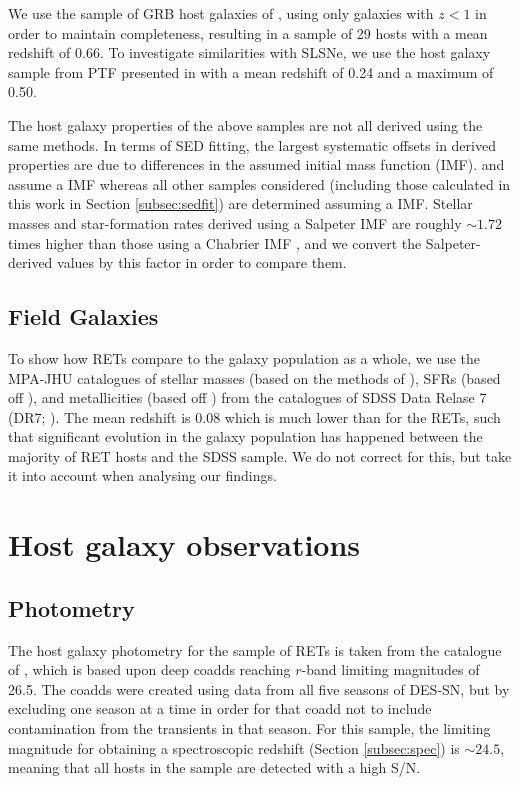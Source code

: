\documentclass[fleqn,usenatbib,]{mnras}
\begin{document}
We use the sample of GRB host galaxies of \citet{Kruehler2015}, using only galaxies with $z<1$ in order to maintain completeness, resulting in a sample of 29 hosts with a mean redshift of 0.66. To investigate similarities with SLSNe, we use the host galaxy sample from PTF presented in \citet{Perley2016c} with a mean redshift of 0.24 and a maximum of 0.50.

The host galaxy properties of the above samples are not all derived using the same methods. In terms of SED fitting, the largest systematic offsets in derived properties are due to differences in the assumed initial mass function (IMF). \citet{Stoll2013} and \citet{Drout2014} assume a \citet{Salpeter1955} IMF whereas all other samples considered (including those calculated in this work in Section \ref{subsec:sedfit}) are determined assuming a \citet{Chabrier2003} IMF. Stellar masses and star-formation rates derived using a Salpeter IMF are roughly $\sim 1.72$ times higher than those using a Chabrier IMF \citep{Speagle2014}, and we convert the Salpeter-derived values by this factor in order to compare them.

\subsection{Field Galaxies \label{subsubsec:sdss}}

To show how RETs compare to the galaxy population as a whole, we use the MPA-JHU catalogues of stellar masses (based on the methods of \citealt{Kauffmann2003,Salim2007}), SFRs (based off \citealt{Brinchmann2004}), and metallicities (based off \citealt{Tremonti2004}) from the  catalogues of SDSS Data Relase 7 (DR7; \citealt{Abazajian2009}). The mean redshift is 0.08 which is much lower than for the RETs, such that significant evolution in the galaxy population has happened between the majority of RET hosts and the SDSS sample. We do not correct for this, but take it into account when analysing our findings. 
\section{Host galaxy observations}
\label{sec:obs}
\subsection{Photometry \label{subsec:phot}}

The host galaxy photometry for the sample of RETs is taken from the catalogue of , which is based upon deep coadds reaching $r$-band limiting magnitudes of 26.5. The coadds were created using data from all five seasons of DES-SN, but by excluding one season at a time in order for that coadd not to include contamination from the transients in that season. For this sample, the limiting magnitude for obtaining a spectroscopic redshift (Section \ref{subsec:spec}) is $\sim 24.5$, meaning that all hosts in the sample are detected with a high S/N.
\end{document}
